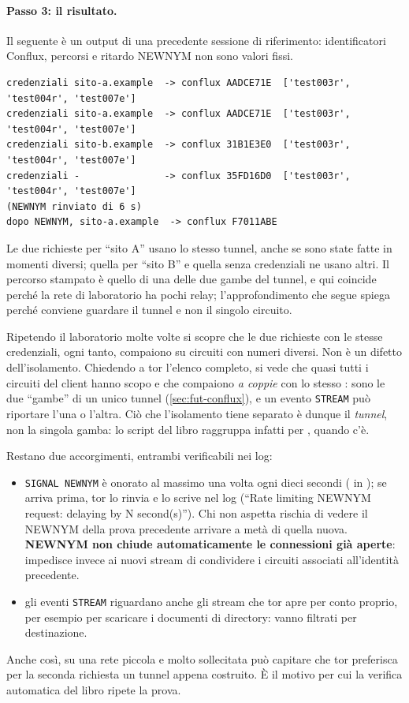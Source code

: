 \paragraph{Passo 3: il risultato.} Il seguente è un output di una precedente sessione di riferimento: identificatori Conflux, percorsi e ritardo NEWNYM non sono valori fissi.
\begin{lstlisting}[numbers=none]
credenziali sito-a.example  -> conflux AADCE71E  ['test003r', 'test004r', 'test007e']
credenziali sito-a.example  -> conflux AADCE71E  ['test003r', 'test004r', 'test007e']
credenziali sito-b.example  -> conflux 31B1E3E0  ['test003r', 'test004r', 'test007e']
credenziali -               -> conflux 35FD16D0  ['test003r', 'test004r', 'test007e']
(NEWNYM rinviato di 6 s)
dopo NEWNYM, sito-a.example  -> conflux F7011ABE
\end{lstlisting}
Le due richieste per \enquote{sito A} usano lo stesso tunnel, anche se sono state fatte in momenti diversi; quella per \enquote{sito B} e quella senza credenziali ne usano altri. Il percorso stampato è quello di una delle due gambe del tunnel, e qui coincide perché la rete di laboratorio ha pochi relay; l'approfondimento che segue spiega perché conviene guardare il tunnel e non il singolo circuito.

\begin{approfondimento}
Ripetendo il laboratorio molte volte si scopre che le due richieste con le stesse credenziali, ogni tanto, compaiono su circuiti con numeri diversi. Non è un difetto dell'isolamento. Chiedendo a tor l'elenco completo, si vede che quasi tutti i circuiti del client hanno scopo  e che compaiono \emph{a coppie} con lo stesso : sono le due \enquote{gambe} di un unico tunnel (\cref{sec:fut-conflux}), e un evento \texttt{STREAM} può riportare l'una o l'altra. Ciò che l'isolamento tiene separato è dunque il \emph{tunnel}, non la singola gamba: lo script del libro raggruppa infatti per , quando c'è.

Restano due accorgimenti, entrambi verificabili nei log:
\begin{itemize}
  \item \texttt{SIGNAL NEWNYM} è onorato al massimo una volta ogni dieci secondi ( in ); se arriva prima, tor lo rinvia e lo scrive nel log (\enquote{Rate limiting NEWNYM request: delaying by N second(s)}). Chi non aspetta rischia di vedere il NEWNYM della prova precedente arrivare a metà di quella nuova. \textbf{NEWNYM non chiude automaticamente le connessioni già aperte}: impedisce invece ai nuovi stream di condividere i circuiti associati all'identità precedente.
  \item gli eventi \texttt{STREAM} riguardano anche gli stream che tor apre per conto proprio, per esempio per scaricare i documenti di directory: vanno filtrati per destinazione.
\end{itemize}
Anche così, su una rete piccola e molto sollecitata può capitare che tor preferisca per la seconda richiesta un tunnel appena costruito. È il motivo per cui la verifica automatica del libro ripete la prova.
\end{approfondimento}

